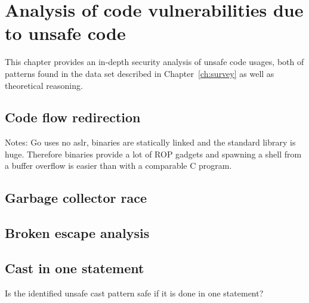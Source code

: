 
\chapter{Analysis of code vulnerabilities due to unsafe code}\label{ch:code-vulnerabilities}

This chapter provides an in-depth security analysis of unsafe code usages, both of patterns found in the data set
described in Chapter~\ref{ch:survey} as well as theoretical reasoning.



\section{Code flow redirection}\label{sec:vulnerability-flow-redirection}

Notes: Go uses no \acrshort{aslr}, binaries are statically linked and the standard library is huge.
Therefore binaries provide a lot of ROP gadgets and spawning a shell from a buffer overflow is easier than with a
comparable C program.



\section{Garbage collector race}\label{sec:vulnerability-gc-race}



\section{Broken escape analysis}\label{sec:vulnerability-escape-analysis}



\section{Cast in one statement}\label{sec:cast-1-statement}

Is the identified unsafe cast pattern safe if it is done in one statement?

